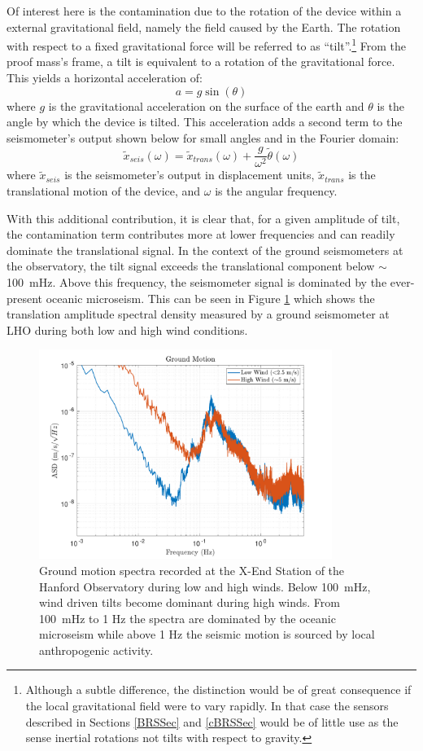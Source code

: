 \documentclass [12pt, proquest]{uwthesis}[2019]
\begin{document}
Of interest here is the contamination due to the rotation of the device within a external gravitational field, namely the field caused by the Earth. The rotation with respect to a fixed gravitational force will be referred to as ``tilt''.\footnote{Although a subtle difference, the distinction would be of great consequence if the local gravitational field were to vary rapidly. In that case the sensors described in Sections \ref{BRSSec} and \ref{cBRSSec} would be of little use as the sense inertial rotations not tilts with respect to gravity.} From the proof mass's frame, a tilt is equivalent to a rotation of the gravitational force. This yields a horizontal acceleration of:
\[ a=g \sin(\theta)\]
where $g$ is the gravitational acceleration on the surface of the earth and $\theta$ is the angle by which the device is tilted. This acceleration adds a second term to the seismometer's output shown below for small angles and in the Fourier domain:
\[\tilde{x}_{seis}(\omega)=\tilde{x}_{trans}(\omega)+\frac{g}{\omega^2}\tilde{\theta}(\omega)\]
where $\tilde{x}_{seis}$ is the seismometer's output in displacement units, $\tilde{x}_{trans}$ is the translational motion of the device, and $\omega$ is the angular frequency. 

With this additional contribution, it is clear that, for a given amplitude of tilt, the contamination term contributes more at lower frequencies and can readily dominate the translational signal. In the context of the ground seismometers at the observatory, the tilt signal exceeds the translational component below $\sim$100~mHz. Above this frequency, the seismometer signal is dominated by the ever-present oceanic microseism. This can be seen in Figure \ref{wind} which shows the translation amplitude spectral density measured by a ground seismometer at LHO during both low and high wind conditions.

\begin{figure}[!h]
\begin{center}
\includegraphics[width=0.85\textwidth]{windComp2.pdf}
\caption[Ground motion spectra during low and high winds]{Ground motion spectra recorded at the X-End Station of the Hanford Observatory during low and high winds. Below 100~mHz, wind driven tilts become dominant during high winds. From 100~mHz to 1 Hz the spectra are dominated by the oceanic microseism while above 1 Hz the seismic motion is sourced by local anthropogenic activity.}
\label{wind}
\end{center}
\end{figure}
\end{document}
